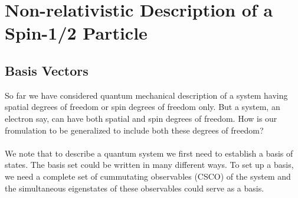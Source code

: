 \section{Non-relativistic Description of a Spin-1/2 Particle}
\subsection{Basis Vectors}
So far we have considered quantum mechanical description of a system having spatial degrees of freedom or spin degrees
of freedom only. But a system, an electron say, can have both spatial and spin degrees of freedom. How is our fromulation
to be generalized to include both these degrees of freedom?

\paragraph{}
We note that to describe a quantum system we first need to establish a basis of states. The basis set could be written in many different ways. To set up a basis, we need a complete set of cummutating observables (CSCO) of the system and the simultaneous 
eigenstates of these observables could serve as a basis.

